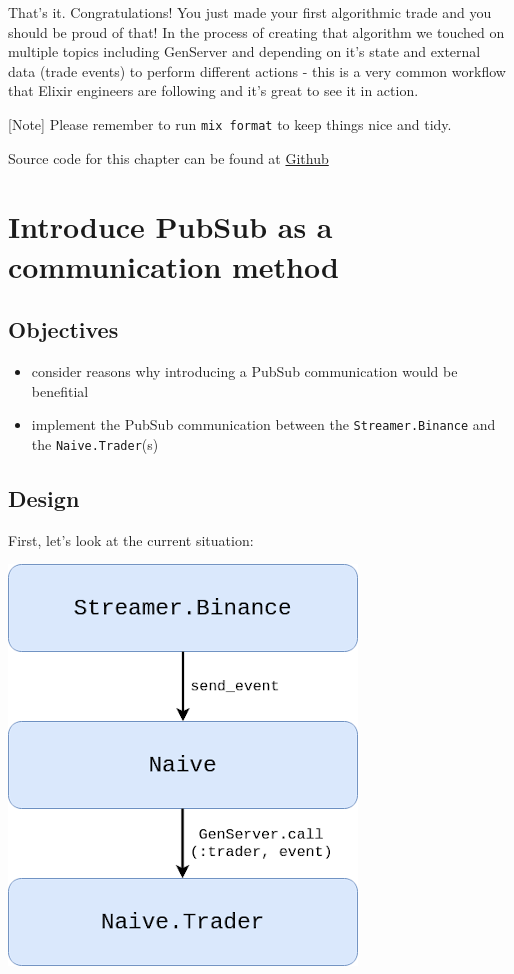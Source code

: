 \documentclass[
  oneside]{book}
\providecommand{\tightlist}{%
  \setlength{\itemsep}{0pt}\setlength{\parskip}{0pt}}
\begin{document}
That's it. Congratulations! You just made your first algorithmic trade and you should be proud of that! In the process of creating that algorithm we touched on multiple topics including GenServer and depending on it's state and external data (trade events) to perform different actions - this is a very common workflow that Elixir engineers are following and it's great to see it in action.

{[}Note{]} Please remember to run \texttt{mix\ format} to keep things nice and tidy.

Source code for this chapter can be found at \href{https://github.com/frathon/create-a-cryptocurrency-trading-bot-in-elixir-source-code/tree/chapter_02}{Github}

\hypertarget{introduce-pubsub-as-a-communication-method}{%
\chapter{Introduce PubSub as a communication method}\label{introduce-pubsub-as-a-communication-method}}

\hypertarget{objectives-2}{%
\section{Objectives}\label{objectives-2}}

\begin{itemize}
\tightlist
\item
  consider reasons why introducing a PubSub communication would be benefitial
\item
  implement the PubSub communication between the \texttt{Streamer.Binance} and the \texttt{Naive.Trader}(s)
\end{itemize}

\hypertarget{design}{%
\section{Design}\label{design}}

First, let's look at the current situation:

\includegraphics{images/chapter_03_01_current_situation.png}
\end{document}

